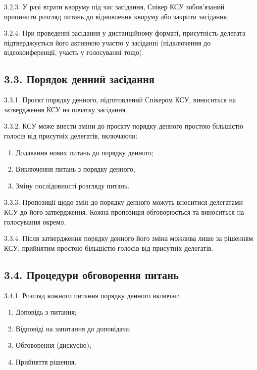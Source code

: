     3.2.3. У разі втрати кворуму під час засідання, Спікер КСУ зобов'язаний припинити розгляд питань до відновлення кворуму або закрити засідання.

    3.2.4. При проведенні засідання у дистанційному форматі, присутність делегата підтверджується його активною участю у засіданні (підключення до відеоконференції, участь у голосуванні тощо).

\subsection*{3.3. Порядок денний засідання}
    3.3.1. Проєкт порядку денного, підготовлений Спікером КСУ, виноситься на затвердження КСУ на початку засідання.

    3.3.2. КСУ може внести зміни до проєкту порядку денного простою більшістю голосів від присутніх делегатів, включаючи:

        \begin{enumerate}[label=\alph*)]
            \item Додавання нових питань до порядку денного;
            \item Виключення питань з порядку денного;
            \item Зміну послідовності розгляду питань.
        \end{enumerate}

    3.3.3. Пропозиції щодо змін до порядку денного можуть вноситися делегатами КСУ до його затвердження. Кожна пропозиція обговорюється та виноситься на голосування окремо.

    3.3.4. Після затвердження порядку денного його зміна можлива лише за рішенням КСУ, прийнятим простою більшістю голосів від присутніх делегатів.

\subsection*{3.4. Процедури обговорення питань}
    3.4.1. Розгляд кожного питання порядку денного включає:

        \begin{enumerate}[label=\alph*)]
            \item Доповідь з питання;
            \item Відповіді на запитання до доповідача;
            \item Обговорення (дискусію);
            \item Прийняття рішення.
        \end{enumerate}

